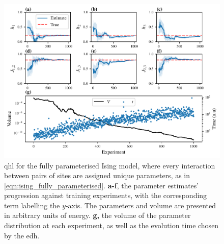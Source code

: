 \begin{figure}
\begin{center}
    \includegraphics{theoretical_study/figures/fully_param_ising_qhl.pdf}
\end{center}
\caption[ for the fully parameterised Ising model]{
    \Acrlong{qhl} for the fully parameterised Ising model, 
        where every interaction between pairs of sites are assigned unique parameters, 
        as in \cref{eqn:ising_fully_parameterised}. 
    \textbf{a-f}, the parameter estimates' progression against training \glspl{experiment}, 
        with the corresponding term labelling the $y$-axis. 
        The parameters and volume are presented in arbitrary units of energy. 
    \textbf{g,} the \gls{volume} of the parameter distribution at each experiment, 
        as well as the evolution time chosen by the \gls{edh}.  
    \figtableref
}
\label{fig:ising_fully_parameterised}
\end{figure}

